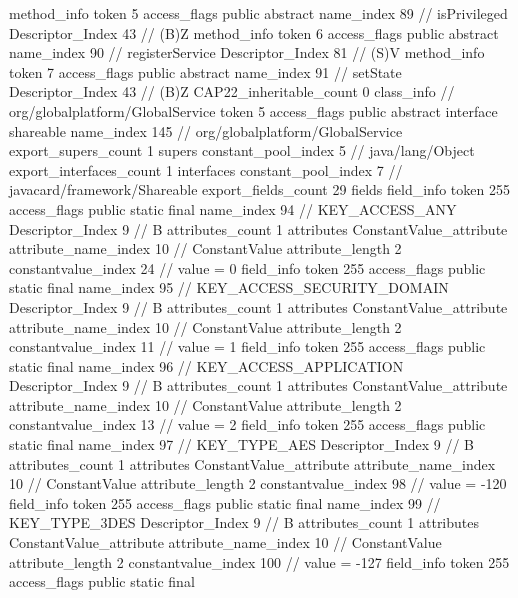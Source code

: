 {{{{{				}
				method_info {
					token	5
					access_flags	public abstract
					name_index	89		// isPrivileged
					Descriptor_Index	43		// (B)Z
				}
				method_info {
					token	6
					access_flags	public abstract
					name_index	90		// registerService
					Descriptor_Index	81		// (S)V
				}
				method_info {
					token	7
					access_flags	public abstract
					name_index	91		// setState
					Descriptor_Index	43		// (B)Z
				}
			}
			CAP22_inheritable_count	0
		}
		class_info {		// org/globalplatform/GlobalService
			token	5
			access_flags	public abstract interface shareable
			name_index	145		// org/globalplatform/GlobalService
			export_supers_count	1
			supers {
				constant_pool_index	5		// java/lang/Object
			}
			export_interfaces_count	1
			interfaces {
				constant_pool_index	7		// javacard/framework/Shareable
			}
			export_fields_count	29
			fields {
			field_info {
				token	255
				access_flags	public static final
				name_index	94		// KEY_ACCESS_ANY
				Descriptor_Index	9		// B
				attributes_count	1
				attributes {
				ConstantValue_attribute {
					attribute_name_index	10		// ConstantValue
					attribute_length	2
					constantvalue_index	24		// value = 0
				}
				}
			}
			field_info {
				token	255
				access_flags	public static final
				name_index	95		// KEY_ACCESS_SECURITY_DOMAIN
				Descriptor_Index	9		// B
				attributes_count	1
				attributes {
				ConstantValue_attribute {
					attribute_name_index	10		// ConstantValue
					attribute_length	2
					constantvalue_index	11		// value = 1
				}
				}
			}
			field_info {
				token	255
				access_flags	public static final
				name_index	96		// KEY_ACCESS_APPLICATION
				Descriptor_Index	9		// B
				attributes_count	1
				attributes {
				ConstantValue_attribute {
					attribute_name_index	10		// ConstantValue
					attribute_length	2
					constantvalue_index	13		// value = 2
				}
				}
			}
			field_info {
				token	255
				access_flags	public static final
				name_index	97		// KEY_TYPE_AES
				Descriptor_Index	9		// B
				attributes_count	1
				attributes {
				ConstantValue_attribute {
					attribute_name_index	10		// ConstantValue
					attribute_length	2
					constantvalue_index	98		// value = -120
				}
				}
			}
			field_info {
				token	255
				access_flags	public static final
				name_index	99		// KEY_TYPE_3DES
				Descriptor_Index	9		// B
				attributes_count	1
				attributes {
				ConstantValue_attribute {
					attribute_name_index	10		// ConstantValue
					attribute_length	2
					constantvalue_index	100		// value = -127
				}
				}
			}
			field_info {
				token	255
				access_flags	public static final
}}}}}
